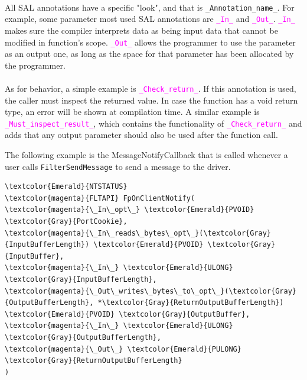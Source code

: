 		\paragraph{}
		All SAL annotations have a specific "look", and that is \texttt{\_Annotation\_name\_}. For example, some parameter most used SAL annotations are \textcolor{magenta}{\texttt{\_In\_}} and \textcolor{magenta}{\texttt{\_Out\_}}. \textcolor{magenta}{\texttt{\_In\_}} makes sure the compiler interprets data as being input data that cannot be modified in function's scope. \textcolor{magenta}{\texttt{\_Out\_}} allows the programmer to use the parameter as an output one, as long as the space for that parameter has been allocated by the programmer.
		
		\paragraph{}
		As for behavior, a simple example is \textcolor{magenta}{\texttt{\_Check\_return\_}}. If this annotation is used, the caller must inspect the returned value. In case the function has a void return type, an error will be shown at compilation time. A similar example is \textcolor{magenta}{\texttt{\_Must\_inspect\_result\_}}, which contains the functionality of \textcolor{magenta}{\texttt{\_Check\_return\_}} and adds that any output parameter should also be used after the function call.
		
		The following example is the MessageNotifyCallback that is called whenever a user calls \texttt{FilterSendMessage} to send a message to the driver. 
		
		\begin{Verbatim}[fontsize=\small, commandchars=\\\{\}]
\textcolor{Emerald}{NTSTATUS}
\textcolor{magenta}{FLTAPI} FpOnClientNotify(
\textcolor{magenta}{\_In\_opt\_} \textcolor{Emerald}{PVOID} \textcolor{Gray}{PortCookie},
\textcolor{magenta}{\_In\_reads\_bytes\_opt\_}(\textcolor{Gray}{InputBufferLength}) \textcolor{Emerald}{PVOID} \textcolor{Gray}{InputBuffer},
\textcolor{magenta}{\_In\_} \textcolor{Emerald}{ULONG} \textcolor{Gray}{InputBufferLength},
\textcolor{magenta}{\_Out\_writes\_bytes\_to\_opt\_}(\textcolor{Gray}{OutputBufferLength}, *\textcolor{Gray}{ReturnOutputBufferLength})
\textcolor{Emerald}{PVOID} \textcolor{Gray}{OutputBuffer},
\textcolor{magenta}{\_In\_} \textcolor{Emerald}{ULONG} \textcolor{Gray}{OutputBufferLength},
\textcolor{magenta}{\_Out\_} \textcolor{Emerald}{PULONG} \textcolor{Gray}{ReturnOutputBufferLength}
)
		
		\end{Verbatim}
		
